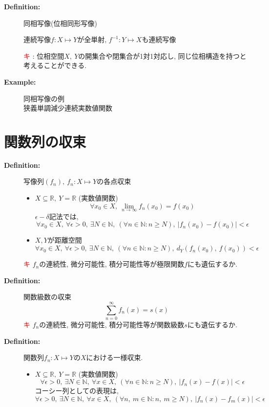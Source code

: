 \documentclass[dvipdfmx]{jsarticle}
\newcommand{\point}{\textcircled{\textcolor{red}{\scriptsize キ}} }
\begin{document}
\begin{description}
    \item[\bf{Definition:}] 同相写像(位相同形写像)
        \begin{center}連続写像$f: X \mapsto Y$が全単射, $f^{-1}: Y \mapsto X$も連続写像\end{center}
        \point: 位相空間$X,\ Y$の開集合や閉集合が1対1対応し, 同じ位相構造を持つと考えることができる.
    \item[\bf{Example:}] 同相写像の例 \\
        狭義単調減少連続実数値関数

\end{description}
\section{関数列の収束}
\begin{description}
    \item[\bf{Definition:}] 写像列$(f_n),\ f_n: X \mapsto Y$の各点収束 \\
    \begin{itemize}
        \item $X \subseteq \mathbb{R},\ Y = \mathbb{R}$ (実数値関数)
            $$\forall x_0 \in X,\ \lim_{n \to \infty} f_n(x_0) = f(x_0) $$
            $\epsilon-\delta$記法では, 
            $$ \forall x_0 \in X,\ \forall \epsilon > 0,\ \exists N \in \mathbb{N},\ (\forall n \in \mathbb{N} : n \geq N),\ | f_n(x_0) - f(x_0) | < \epsilon $$

        \item $X, Y$が距離空間
        $$ \forall x_0 \in X,\ \forall \epsilon > 0,\ \exists N \in \mathbb{N},\ (\forall n \in \mathbb{N} : n \geq N),\ d_Y(f_n(x_0),\ f(x_0)) < \epsilon $$
    \end{itemize}
        \point $f_n$の連続性, 微分可能性, 積分可能性等が極限関数$f$にも遺伝するか.

    \item[\bf{Definition:}] 関数級数の収束 \\
        $$\sum_{n=0}^{\infty} f_n(x) = s(x)$$
    \point $f_n$の連続性, 微分可能性, 積分可能性等が関数級数$s$にも遺伝するか.

    \item[\bf{Definition:}] 関数列$f_n: X \mapsto Y$の$X$における一様収束.
    \begin{itemize}
        \item $X \subseteq \mathbb{R},\ Y = \mathbb{R}$ (実数値関数)
            $$\forall \epsilon > 0,\ \exists N \in \mathbb{N},\ \forall x \in X,\ (\forall n \in \mathbb{N} : n \geq N),\ | f_n(x) - f(x) | < \epsilon$$
            コーシー列としての表現は, 
            $$\forall \epsilon > 0,\ \exists N \in \mathbb{N},\ \forall x \in X,\ (\forall n,\ m \in \mathbb{N} : n,\ m \geq N),\ | f_n(x) - f_m(x) | < \epsilon$$
    

\end{itemize}
\end{description}
\end{document}
